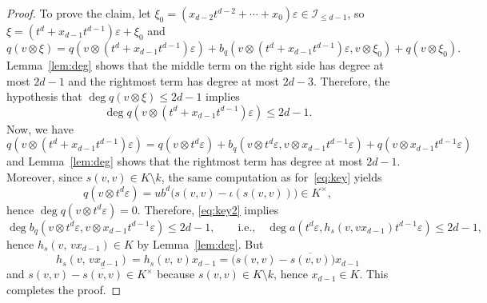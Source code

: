 \documentclass[10pt,a4paper]{amsart}
\newcommand{\calI}{\mathcal{I}}
\begin{document}
\begin{proof}
  To prove the claim,
  let $\xi_0=(x_{d-2}t^{d-2}+\cdots+x_0)\varepsilon\in \calI_{\leq
    d-1}$, so $\xi=(t^d+x_{d-1}t^{d-1})\varepsilon+\xi_0$ and
  \[
    q(v\otimes\xi) = q(v\otimes(t^d+x_{d-1}t^{d-1})\varepsilon) +
    b_q(v\otimes(t^d+x_{d-1}t^{d-1})\varepsilon, v\otimes\xi_0) +
    q(v\otimes\xi_0).
  \]
  Lemma~\ref{lem:deg} shows that the middle
  term on the right side has degree at most $2d-1$ and the rightmost
  term has degree at most $2d-3$. Therefore, the hypothesis that $\deg
  q(v\otimes\xi)\leq 2d-1$ implies
  \begin{equation}
    \label{eq:key2}
    \deg q(v\otimes(t^d+x_{d-1}t^{d-1})\varepsilon) \leq
    2d-1.
  \end{equation}
  Now, we have
  \[
    q(v\otimes(t^d+x_{d-1}t^{d-1})\varepsilon)=q(v\otimes
    t^d\varepsilon) + b_q(v\otimes t^d\varepsilon, v\otimes
    x_{d-1}t^{d-1}\varepsilon) + q(v\otimes x_{d-1}t^{d-1}\varepsilon)
  \]
  and Lemma~\ref{lem:deg} shows that the rightmost term has degree at
  most $2d-1$. Moreover, since $s(v,v)\in K\setminus
  k$, the same computation as for~\eqref{eq:key} yields
  \[
    q(v\otimes t^d\varepsilon) = ub^d\bigl(s(v,v)-\iota(s(v,v))\bigr)
    \in K^\times,
  \]
  hence $\deg q(v\otimes t^d\varepsilon) = 0$. Therefore,
  \eqref{eq:key2} implies
  \[
    \deg b_q(v\otimes t^d\varepsilon,v\otimes
    x_{d-1}t^{d-1}\varepsilon)\leq 2d-1,
    \qquad\text{i.e.,}\quad
    \deg a(t^d\varepsilon, h_s(v,vx_{d-1})t^{d-1}\varepsilon) \leq
    2d-1, 
  \]
  hence $h_s(v,\,vx_{d-1})\in K$ by
  Lemma~\ref{lem:deg}. But
  \[
    h_s(v,\,vx_{d-1}) = h_s(v,\,v)x_{d-1} = \bigl(s(v,v) -
    \overline{s(v,v)}\bigr) x_{d-1}
  \]
  and $s(v,v)-\overline{s(v,v)}\in K^\times$ because $s(v,v)\in
  K\setminus k$, hence $x_{d-1}\in K$. This completes the proof.
\end{proof}
\end{document}
